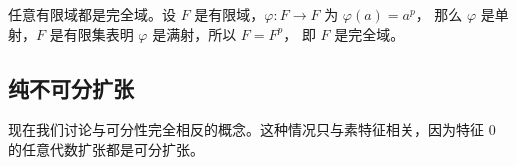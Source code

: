 \begin{example}
  任意有限域都是完全域。设 $F$ 是有限域，$\varphi:F\to F$ 为 $\varphi(a)=a^p$，
  那么 $\varphi$ 是单射，$F$ 是有限集表明 $\varphi$ 是满射，所以 $F=F^p$，
  即 $F$ 是完全域。
\end{example}

\subsection{纯不可分扩张}

现在我们讨论与可分性完全相反的概念。这种情况只与素特征相关，因为特征 $0$ 的任意代数扩张都是可分扩张。





